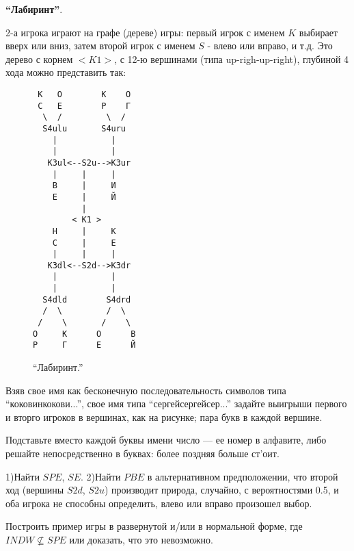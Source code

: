\documentclass[a4paper,12pt]{article}
\begin{document}
\begin{exmp}
{\bf ``Лабиринт''}. {\rm 2-а игрока играют на графе
(дереве) игры: первый игрок с именем $K$ выбирает вверх или
вниз, затем второй игрок с именем $S$ - влево или вправо, и
т.д. Это дерево с корнем $<K1>$, с 12-ю вершинами (типа
up-righ-up-right), глубиной 4 хода можно представить так:

\begin{figure}[h]
\begin{verbatim}
 К   О        К    О
 С   Е        Р    Г
  \  /         \  /
  S4ulu       S4uru
    |           |
    |           |
   K3ul<--S2u-->K3ur
    |     |     |
    В     |     И
    Е     |     Й
          |
        < K1 >
    Н     |     К
    С     |     Е
    |     |     |
   K3dl<--S2d-->K3dr
    |           |
    |           |
  S4dld        S4drd
  /  \         /  \
 /    \       /    \
О     К      О      В
Р     Г      Е      Й
\end{verbatim}\caption{``Лабиринт.''}
\end{figure}

Взяв свое имя как бесконечную последовательность символов
типа ``коковинкокови...'', свое имя типа
``сергейсергейсер...'' задайте выигрыши первого и вторго
игроков в вершинах, как на рисунке; пара букв в каждой
вершине.

Подставьте вместо каждой буквы имени число — ее номер в
алфавите, либо решайте непосредственно в буквах: более
поздняя больше ст'оит.

1)Найти $SPE$, $SE$. 2)Найти $PBE$ в альтернативном
предположении, что второй ход (вершины $S2d$, $S2u$)
производит природа, случайно, с вероятностями 0.5, и оба
игрока не способны определить, влево или вправо произошел
выбор. }\end{exmp} \vspace{2mm}



\begin{exmp}{\rm
Построить пример игры в развернутой и/или в нормальной
форме, где $INDW \not\subseteq SPE$ или доказать, что это
невозможно. }\end{exmp}
\end{document}
